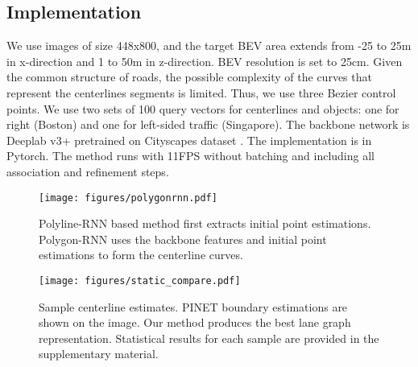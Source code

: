 \documentclass[10pt,twocolumn,letterpaper]{article}
\begin{document}
\subsection{Implementation}
We use images of size 448x800, and the target BEV area extends from -25 to 25m in x-direction and 1 to 50m in z-direction. BEV resolution is set to 25cm. Given the common structure of roads, the possible complexity of the curves that represent the centerlines segments is limited. Thus, we use three Bezier control points. We use two sets of 100 query vectors for centerlines and objects: one for right (Boston) and one for left-sided traffic (Singapore). The backbone network is Deeplab v3+ \cite{DBLP:conf/eccv/ChenZPSA18} pretrained on Cityscapes dataset \cite{Cordts2016Cityscapes}. The implementation is in Pytorch. The method runs with 11FPS without batching and including all association and refinement steps.



\begin{figure}
    \centering
    \texttt{[image: figures/polygonrnn.pdf]}
    \caption{Polyline-RNN based method first extracts initial point estimations. Polygon-RNN uses the backbone features and initial point estimations to form the centerline curves. }
    \label{fig:polygon_rnn}
\end{figure}

\begin{figure*}
    \centering
    \texttt{[image: figures/static\_compare.pdf]}
    \caption{Sample centerline estimates. PINET boundary estimations are shown on the image. Our method produces the best lane graph representation. Statistical results for each sample are provided in the supplementary material. }
    \label{fig:lane-visual}
\end{figure*}
\end{document}
